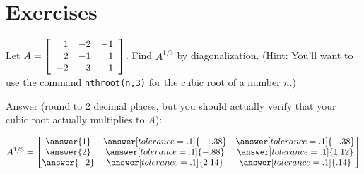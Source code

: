 \documentclass{ximera}
\author{Zack Reed}
\begin{document}
\section*{Exercises}


\begin{example}
  Let $A = \startmat{rrr}
    1 & -2 & -1 \\
    2 & -1 & 1 \\
    -2 & 3 & 1
  \stopmat$. Find $A^{1/3}$ by diagonalization. (Hint: You'll want to use the command \texttt{nthroot(n,3)} for the cubic root of a number $n$.)

  Answer (round to 2 decimal places, but you should actually verify that your cubic root actually multiplies to $A$):

  $A^{1/3}=\begin{bmatrix}
    \answer{1} & \answer[tolerance=.1]{-1.38} & \answer[tolerance=.1]{-.38}\\
    \answer{2} & \answer[tolerance=.1]{-.88} & \answer[tolerance=.1]{1.12}\\
    \answer{-2} & \answer[tolerance=.1]{2.14} & \answer[tolerance=.1]{.14}
  \end{bmatrix}$
\end{example}
\end{document}
